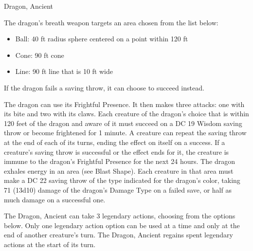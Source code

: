 \begin{DndMonster}[width=\textwidth + 8pt]{Dragon, Ancient}
\begin{multicols}{2}
 The dragon's breath weapon targets an area chosen from the list below:
\begin{itemize}
	\item[]Ball: 40 ft radius sphere centered on a point within 120 ft
	\item[]Cone: 90 ft cone
	\item[]Line: 90 ft line that is 10 ft wide
\end{itemize}

 If the dragon fails a saving throw, it can choose to succeed instead.

 The dragon can use its Frightful Presence. It then makes three attacks: one with its bite and two with its claws.
\DndMonsterAttack[
	name=Bite,
	distance=melee,
	type=weapon,
	mod=+15,
	reach=15,
	dmg=\DndDice{2d10 + 8},
	dmg-type=piercing,
	extra={ plus 9 (2d8) damage of the dragon's Damage Type.}
]
\DndMonsterAttack[
	name=Claw,
	distance=melee,
	type=weapon,
	mod=+15,
	reach=10,
	dmg=\DndDice{2d6 + 8},
	dmg-type=slashing
]
\DndMonsterAttack[
	name=Tail,
	distance=melee,
	type=weapon,
	mod=+15,
	reach=20,
	dmg=\DndDice{2d8 + 8},
	dmg-type=bludgeoning
]
Each creature of the dragon's choice that is within 120 feet of the dragon and aware of it must succeed on a DC 19 Wisdom saving throw or become frightened for 1 minute. A creature can repeat the saving throw at the end of each of its turns, ending the effect on itself on a success. If a creature's saving throw is successful or the effect ends for it, the creature is immune to the dragon's Frightful Presence for the next 24 hours.
The dragon exhales energy in an area (see Blast Shape). Each creature in that area must make a DC 22 saving throw of the type indicated for the dragon's color, taking 71 (13d10) damage of the dragon's Damage Type on a failed save, or half as much damage on a successful one.

The Dragon, Ancient can take 3 legendary actions, choosing from the options below. Only one legendary action option can be used at a time and only at the end of another creature's turn. The Dragon, Ancient regains spent legendary actions at the start of its turn.
\begin{DndMonsterLegendaryActions}
\end{DndMonsterLegendaryActions}

\end{multicols}
\end{DndMonster}
